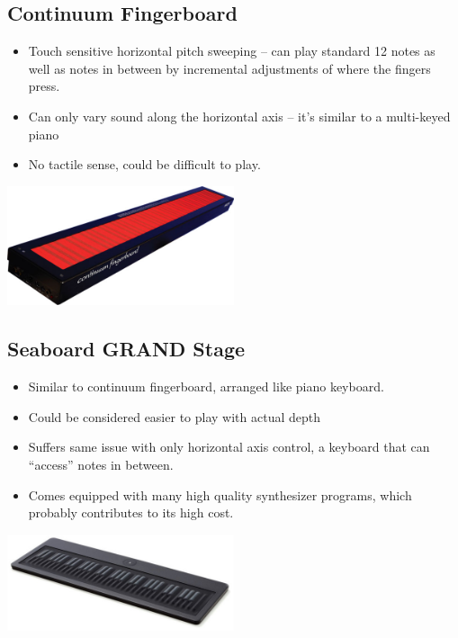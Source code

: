 \documentclass{article}
\begin{document}
\subsection*{Continuum Fingerboard}

\begin{itemize}
	\item Touch sensitive horizontal pitch sweeping – can play standard 12 notes as well as notes in between by incremental adjustments of where the fingers press.
	\item Can only vary sound along the horizontal axis – it’s similar to a multi-keyed piano
	\item No tactile sense, could be difficult to play.
\end{itemize}

\begin{center}
\includegraphics[width=0.5\textwidth]{mt5.jpg}
\end{center}

\subsection*{Seaboard GRAND Stage}

\begin{itemize}
	\item Similar to continuum fingerboard, arranged like piano keyboard.
	\item Could be considered easier to play with actual depth
	\item Suffers same issue with only horizontal axis control, a keyboard that can “access” notes in between.
	\item Comes equipped with many high quality synthesizer programs, which probably contributes to its high cost.
\end{itemize}

\begin{center}
\includegraphics[width=0.5\textwidth]{mt6.jpeg}
\end{center}
\end{document}
